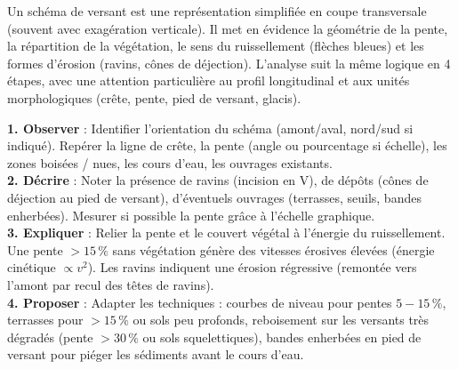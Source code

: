 \documentclass[11pt]{article}
\newcommand{\cle}[1]{{\popxbold\color{popdark}#1}}
\begin{document}
Un schéma de versant est une représentation simplifiée en coupe transversale (souvent avec exagération verticale). Il met en évidence la géométrie de la pente, la répartition de la végétation, le sens du ruissellement (flèches bleues) et les formes d'érosion (ravins, cônes de déjection). L'analyse suit la même logique en 4 étapes, avec une attention particulière au \cle{profil longitudinal} et aux \cle{unités morphologiques} (crête, pente, pied de versant, glacis).

\begin{methode}
\textbf{1. Observer} : Identifier l'orientation du schéma (amont/aval, nord/sud si indiqué). Repérer la ligne de crête, la pente (angle ou pourcentage si échelle), les zones boisées / nues, les cours d'eau, les ouvrages existants.\\
\textbf{2. Décrire} : Noter la présence de ravins (incision en V), de dépôts (cônes de déjection au pied de versant), d'éventuels ouvrages (terrasses, seuils, bandes enherbées). Mesurer si possible la pente grâce à l'échelle graphique.\\
\textbf{3. Expliquer} : Relier la pente et le couvert végétal à l'énergie du ruissellement. Une pente $> 15\,\%$ sans végétation génère des vitesses érosives élevées (énergie cinétique $\propto v^2$). Les ravins indiquent une érosion régressive (remontée vers l'amont par recul des têtes de ravins).\\
\textbf{4. Proposer} : Adapter les techniques : courbes de niveau pour pentes $5-15\,\%$, terrasses pour $> 15\,\%$ ou sols peu profonds, reboisement sur les versants très dégradés (pente $> 30\,\%$ ou sols squelettiques), bandes enherbées en pied de versant pour piéger les sédiments avant le cours d'eau.
\end{methode}
\end{document}
